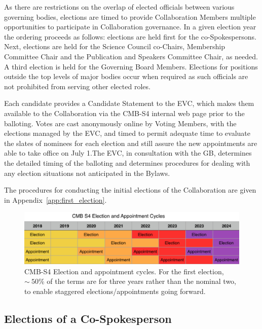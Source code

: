 \documentclass[12pt]{article}
\begin{document}
As there are restrictions on the overlap of elected officials between various governing bodies, elections are timed to provide Collaboration Members multiple opportunities to participate in Collaboration governance. 
In a given election year the ordering proceeds as follows: elections are held first for the co-Spokespersons. Next, elections are held for the Science Council co-Chairs, Membership Committee Chair and the Publication and Speakers Committee Chair, as needed.  A third election is held for the Governing Board Members. 
Elections for positions outside the top levels of major bodies occur when required as such officials are not prohibited from serving other elected roles. 

Each candidate provides a Candidate Statement to the EVC, which makes them available to the Collaboration via the CMB-S4 internal web page prior to the balloting.   Votes are cast anonymously online by Voting Members, with the elections managed by the EVC, and timed to permit adequate time to evaluate the slates of nominees for each election and still assure the new appointments are able to take office on July 1.The EVC, in consultation with the GB,  determines the detailed timing of the balloting and determines procedures for dealing with any election situations not anticipated in the Bylaws.

The procedures for conducting the initial elections of the Collaboration are given in Appendix~\ref{app:first_election}.



\begin{figure}[h!]
\begin{center}
\includegraphics[width=6.5in]{Election_cycle_v2.png}
\end{center}
\caption{CMB-S4 Election and appointment cycles. For the first election, $\sim\ 50$\% of the terms are for three years rather than the nominal two, to enable staggered elections/appointments going forward.}
\label{fig:elect_cycle}
\end{figure}

\subsection{Elections of a Co-Spokesperson}
\end{document}

